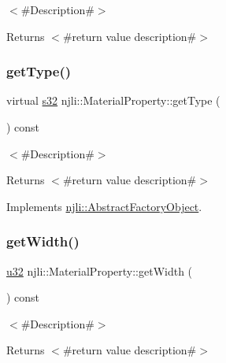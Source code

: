 $<$\#\+Description\#$>$

\begin{DoxyReturn}{Returns}
$<$\#return value description\#$>$ 
\end{DoxyReturn}
\mbox{\label{classnjli_1_1_material_property_aad6d725e907d46679f9aeac68f91ff42}} 
\subsubsection{\texorpdfstring{get\+Type()}{getType()}}
{\footnotesize\ttfamily virtual \mbox{\hyperlink{_util_8h_aa62c75d314a0d1f37f79c4b73b2292e2}{s32}} njli\+::\+Material\+Property\+::get\+Type (\begin{DoxyParamCaption}{ }\end{DoxyParamCaption}) const\hspace{0.3cm}{\ttfamily [virtual]}}

$<$\#\+Description\#$>$

\begin{DoxyReturn}{Returns}
$<$\#return value description\#$>$ 
\end{DoxyReturn}


Implements \mbox{\hyperlink{classnjli_1_1_abstract_factory_object_a207c86146d40d0794708ae7f2d4e60a7}{njli\+::\+Abstract\+Factory\+Object}}.

\mbox{\label{classnjli_1_1_material_property_a03191c04ff259c86536626a6efcaf6d5}} 
\subsubsection{\texorpdfstring{get\+Width()}{getWidth()}}
{\footnotesize\ttfamily \mbox{\hyperlink{_util_8h_a10e94b422ef0c20dcdec20d31a1f5049}{u32}} njli\+::\+Material\+Property\+::get\+Width (\begin{DoxyParamCaption}{ }\end{DoxyParamCaption}) const}

$<$\#\+Description\#$>$

\begin{DoxyReturn}{Returns}
$<$\#return value description\#$>$ 
\end{DoxyReturn}
\mbox{\label{classnjli_1_1_material_property_a88eebd11319add4290b5d7d28a177161}} 
